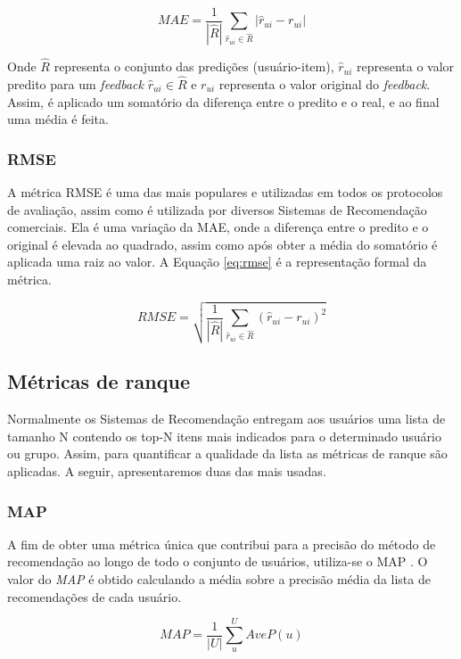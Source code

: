 \begin{equation}
    MAE = \frac{1}{|\hat{R}|}\sum_{\hat{r}_{ui} \in \hat{R}} |\hat{r}_{ui} - r_{ui}|
    \label{eq:mae}
\end{equation}

Onde $\hat{R}$ representa o conjunto das predições (usuário-item), $\hat{r}_{ui}$ representa o valor predito para um \textit{feedback} $\hat{r}_{ui} \in \hat{R}$ e $r_{ui}$ representa o valor original do \textit{feedback}. Assim, é aplicado um somatório da diferença entre o predito e o real, e ao final uma média é feita.

\subsubsection{RMSE}
A métrica \ac{RMSE} é uma das mais populares e utilizadas em todos os protocolos de avaliação, assim como é utilizada por diversos Sistemas de Recomendação comerciais. Ela é uma variação da \ac{MAE}, onde a diferença entre o predito e o original é elevada ao quadrado, assim como após obter a média do somatório é aplicada uma raiz ao valor. A Equação \ref{eq:rmse} é a representação formal da métrica.

\begin{equation}
    RMSE = \sqrt{\frac{1}{|\hat{R}|}\sum_{\hat{r}_{ui} \in \hat{R}} (\hat{r}_{ui} - r_{ui})^2}
    \label{eq:rmse}
\end{equation}

\subsection{Métricas de ranque}
\label{sec:rank_metrics}
Normalmente os Sistemas de Recomendação  entregam aos usuários uma lista de tamanho N contendo os top-N itens mais indicados para o determinado usuário ou grupo. Assim, para quantificar a qualidade da lista as métricas de ranque são aplicadas. A seguir, apresentaremos duas das mais usadas.

\subsubsection{MAP}
A fim de obter uma métrica única que contribui para a precisão do método de recomendação ao longo de todo o conjunto de usuários, utiliza-se o \ac{MAP} \cite{Parra:2013}. O valor do \textit{\ac{MAP}} é obtido calculando a média sobre a precisão média da lista de recomendações de cada usuário.

\begin{equation}
    \label{eq:map}
    MAP = \frac{1}{|U|}\sum_{u}^{U}AveP(u)
\end{equation}

